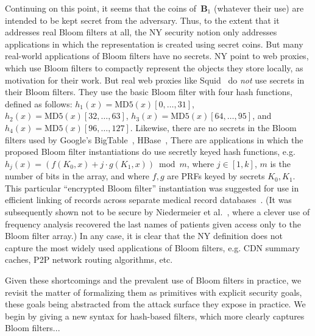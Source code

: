 Continuing on this point, it seems that the coins of~$\mathbf{B}_1$
(whatever their use) are intended to be kept secret from the
adversary.  Thus, to the extent that it addresses real Bloom filters
at all, the NY security notion only addresses applications in which
the representation is created using secret coins.  But many
real-world applications of Bloom filters have no secrets.  NY point
to web proxies, which use Bloom filters to compactly represent the
objects they store locally, as motivation for their work.  But real
web proxies like Squid~\cite{xxx} do \emph{not} use secrets in their
Bloom filters.  They use the basic Bloom filter with four hash
functions, defined as follows: $h_1(x) =
\mathrm{MD5}(x)[0,\ldots,31]$,
$h_2(x)=\mathrm{MD5}(x)[32,\ldots,63]$,
$h_3(x)=\mathrm{MD5}(x)[64,\ldots,95]$, and
$h_4(x)=\mathrm{MD5}(x)[96,\ldots,127]$.  Likewise, there are no
secrets in the Bloom filters used by Google's BigTable~\cite{xxx},
HBase~\cite{xxx},   There are
applications in which the proposed Bloom filter instantiations do
use secretly keyed hash functions, e.g. $h_j(x) = (f(K_0,x) + j\cdot
g(K_1,x))\bmod m$, where $j\in[1,k]$, $m$ is the number of bits in
the array, and where $f,g$ are PRFs keyed by secrets $K_0,K_1$.
This particular ``encrypted Bloom filter'' instantiation was
suggested for use in efficient linking of records across separate
medical record databases~\cite{xxx}.  (It was subsequently shown not
to be secure by Niedermeier et al.~\cite{xxx}, where a clever use of
frequency analysis recovered the last names of patients given access
only to the Bloom filter array.)
In any case, it is clear that the NY definition does not capture the
most widely used applications of Bloom filters, e.g. CDN summary
caches, P2P network routing algorithms, etc. 


Given these shortcomings and the prevalent use of Bloom filters in practice, we revisit the matter of formalizing them as primitives with explicit security goals, these goals being abstracted from the attack surface they expose in practice.   We begin by giving a new syntax for hash-based filters, which more clearly captures Bloom filters...

